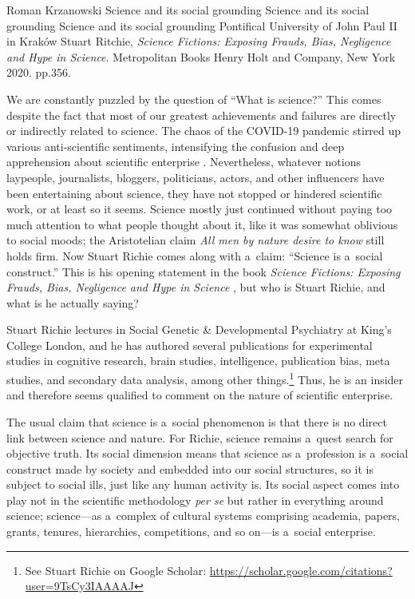 \begin{newrevengenv}{Roman Krzanowski}
	{Science and its social grounding}
	{Science and its social grounding}
	{Science and its social grounding}
	{Pontifical University of John Paul II in Kraków}
	{Stuart Ritchie, \textit{Science Fictions: Exposing Frauds, Bias, Negligence and Hype in Science}. Metropolitan Books Henry Holt and Company, New York 2020. pp.356.}





\lettrine[loversize=0.13,lines=2,lraise=-0.01,nindent=0em,findent=0.2pt]%
{W}{}e are constantly puzzled by the question of ``What is science?'' This comes despite the fact that most of our greatest achievements and failures are directly or indirectly related to science. The chaos of the COVID-19 pandemic stirred up various anti-scientific sentiments, intensifying the confusion and deep apprehension about scientific enterprise
\parencites[see e.g.][]{mcgilchrist_2021}[][]{blaylock_covid_2022}. %
 Nevertheless, whatever notions laypeople, journalists, bloggers, politicians, actors, and other influencers have been entertaining about science, they have not stopped or hindered scientific work, or at least so it seems. Science mostly just continued without paying too much attention to what people thought about it, like it was somewhat oblivious to social moods; the Aristotelian claim \textit{All men by nature desire to know} still holds firm. Now Stuart Richie comes along with a~claim: ``Science is a~social construct.'' This is his opening statement in the book \textit{Science Fictions: Exposing Frauds, Bias, Negligence and Hype in Science} 
\parencite*[][]{ritchie_science_2020}, %
 but who is Stuart Richie, and what is he actually saying?

Stuart Richie lectures in Social Genetic \& Developmental Psychiatry at King's College London, and he has authored several publications for experimental studies in cognitive research, brain studies, intelligence, publication bias, meta studies, and secondary data analysis, among other things.\footnote{See Stuart Richie on Google Scholar: \url{https://scholar.google.com/citations?user=9TsCy3IAAAAJ}} Thus, he is an insider and therefore seems qualified to comment on the nature of scientific enterprise.

The usual claim that science is a~social phenomenon
\parencites[see e.g.][]{bloor_knowledge_1976}[][]{bloor_knowledge_1991}[][]{mackenzie_notes_1981}[][]{longino_social_2002} %
 is that there is no direct link between science and nature. For Richie, science remains a~quest search for objective truth. Its social dimension means that science as a~profession is a~social construct made by society and embedded into our social structures, so it is subject to social ills, just like any human activity is. Its social aspect comes into play not in the scientific methodology \textit{per se} but rather in everything around science; science—as a~complex of cultural systems comprising academia, papers, grants, tenures, hierarchies, competitions, and so on—is a~social enterprise.


\end{newrevengenv}
